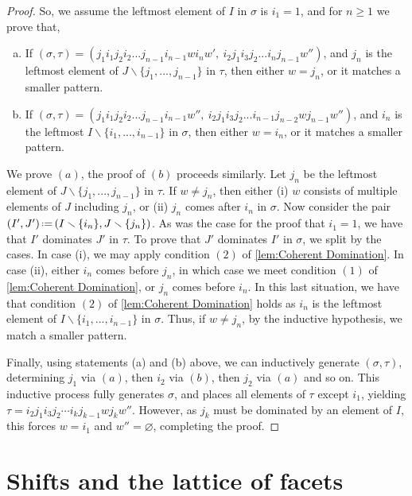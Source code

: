 \documentclass{amsart}
\theoremstyle{definition}
\newcommand{\ssm}{\smallsetminus} %
\newcommand{\eqdef}{\mbox{\,\raisebox{0.2ex}{\scriptsize\ensuremath{\mathrm:}}\ensuremath{=}\,}} %
\begin{document}
\begin{proof}
So, we assume the leftmost element of $I$ in $\sigma$ is $i_1=1$, and for $n\geq1$ we prove that,
\begin{enumerate}[(a)]
    \item If $(\sigma,\tau)=(j_1 i_1 j_2 i_2 ... j_{n-1} i_{n-1} w i_{n} w', \ i_2 j_1 i_3 j_2 ... i_{n}j_{n-1}w'') $, and $j_n$ is the leftmost element of $J\ssm \{j_1,...,j_{n-1}\}$ in $\tau$, then either $w = j_n$, or it matches a smaller pattern.
    \item If $(\sigma,\tau)=(j_1 i_1 j_2 i_2 ... j_{n-1} i_{n-1} w'', \ i_2 j_1 i_3 j_2 ... i_{n-1}j_{n-2} w j_{n-1} w'')$, and $i_n$ is the leftmost $I\ssm \{i_1,...,i_{n-1}\}$ in $\sigma$, then either $w = i_n$, or it matches a smaller pattern.
\end{enumerate}
We prove $(a)$, the proof of $(b)$ proceeds similarly. 
Let $j_n$ be the leftmost element of $J\ssm \{j_1,...,j_{n-1} \}$ in $\tau$.
If $w\neq j_n$, then either (i) $w$ consists of multiple elements of $J$ including $j_n$, or (ii) $j_n$ comes after $i_n$ in $\sigma$.
Now consider the pair $(I',J') \eqdef (I\ssm \{i_n\}, J \ssm \{j_n\})$.
As was the case for the proof that $i_1=1$, we have that $I'$ dominates $J'$ in $\tau$.
To prove that $J'$ dominates $I'$ in $\sigma$, we split by the cases.
In case (i), we may apply condition $(2)$ of \cref{lem:Coherent Domination}.
In case (ii), either $i_n$ comes before $j_n$, in which case we meet condition $(1)$ of \cref{lem:Coherent Domination}, or $j_n$ comes before $i_n$.
In this last situation, we have that condition $(2)$ of \cref{lem:Coherent Domination} holds as $i_n$ is the leftmost element of $I\ssm \{i_1,...,i_{n-1} \}$ in $\sigma$.
Thus, if $w \neq j_n$, by the inductive hypothesis, we match a smaller pattern.

Finally, using statements (a) and (b) above, we can inductively generate $(\sigma,\tau)$, determining $j_1$ via $(a)$, then $i_2$ via $(b)$, then $j_2$ via $(a)$ and so on.
This inductive process fully generates $\sigma$, and places all elements of $\tau$ except $i_1$, yielding $\tau=i_2 j_1 i_3 j_2 \cdots i_k j_{k-1} w j_k w''$.
However, as $j_k$ must be dominated by an element of $I$, this forces $w = i_1$ and $w'' =\varnothing$, completing the proof.
\end{proof}


\newpage
\section{Shifts and the lattice of facets}
\label{sec:shifts}
\end{document}
